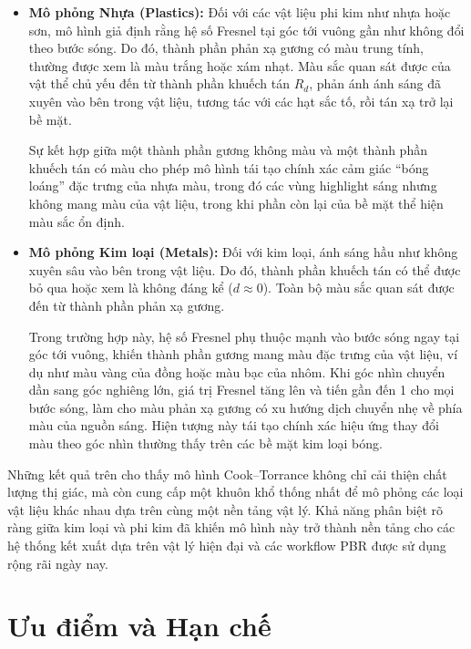 \begin{itemize}
	\item \textbf{Mô phỏng Nhựa (Plastics):}  
	Đối với các vật liệu phi kim như nhựa hoặc sơn, mô hình giả định rằng hệ số Fresnel tại góc tới vuông gần như không đổi theo bước sóng. Do đó, thành phần phản xạ gương có màu trung tính, thường được xem là màu trắng hoặc xám nhạt. Màu sắc quan sát được của vật thể chủ yếu đến từ thành phần khuếch tán $R_d$, phản ánh ánh sáng đã xuyên vào bên trong vật liệu, tương tác với các hạt sắc tố, rồi tán xạ trở lại bề mặt.  
	
	Sự kết hợp giữa một thành phần gương không màu và một thành phần khuếch tán có màu cho phép mô hình tái tạo chính xác cảm giác “bóng loáng” đặc trưng của nhựa màu, trong đó các vùng highlight sáng nhưng không mang màu của vật liệu, trong khi phần còn lại của bề mặt thể hiện màu sắc ổn định.
	
	\item \textbf{Mô phỏng Kim loại (Metals):}  
	Đối với kim loại, ánh sáng hầu như không xuyên sâu vào bên trong vật liệu. Do đó, thành phần khuếch tán có thể được bỏ qua hoặc xem là không đáng kể ($d \approx 0$). Toàn bộ màu sắc quan sát được đến từ thành phần phản xạ gương.  
	
	Trong trường hợp này, hệ số Fresnel phụ thuộc mạnh vào bước sóng ngay tại góc tới vuông, khiến thành phần gương mang màu đặc trưng của vật liệu, ví dụ như màu vàng của đồng hoặc màu bạc của nhôm. Khi góc nhìn chuyển dần sang góc nghiêng lớn, giá trị Fresnel tăng lên và tiến gần đến 1 cho mọi bước sóng, làm cho màu phản xạ gương có xu hướng dịch chuyển nhẹ về phía màu của nguồn sáng. Hiện tượng này tái tạo chính xác hiệu ứng thay đổi màu theo góc nhìn thường thấy trên các bề mặt kim loại bóng.
\end{itemize}

Những kết quả trên cho thấy mô hình Cook--Torrance không chỉ cải thiện chất lượng thị giác, mà còn cung cấp một khuôn khổ thống nhất để mô phỏng các loại vật liệu khác nhau dựa trên cùng một nền tảng vật lý. Khả năng phân biệt rõ ràng giữa kim loại và phi kim đã khiến mô hình này trở thành nền tảng cho các hệ thống kết xuất dựa trên vật lý hiện đại và các workflow PBR được sử dụng rộng rãi ngày nay.

\section{Ưu điểm và Hạn chế}

